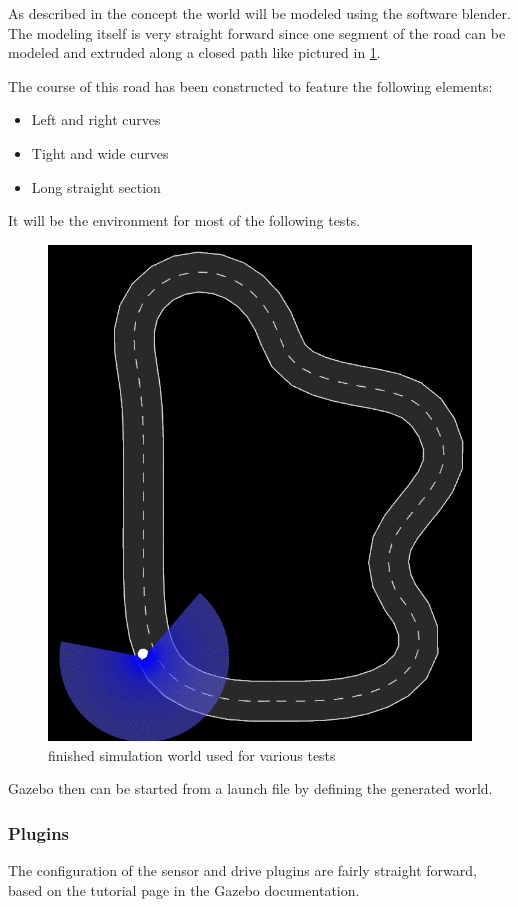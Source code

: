 As described in the concept the world will be modeled using the software blender.\\

The modeling itself is very straight forward since one segment of the road can be modeled and extruded along a closed path like pictured in \ref{simworld}. 

The course of this road has been constructed to feature the following elements:

\begin{itemize}
	\item Left and right curves
	\item Tight and wide curves
	\item Long straight section
\end{itemize}

It will be the environment for most of the following tests.

\begin{figure}
	\centering
	\includegraphics[width=.5\textwidth]{Pictures/test track}
	\caption{finished simulation world used for various tests}
	\label{simworld}
\end{figure}

Gazebo then can be started from a launch file by defining the generated world.\\

\subsubsection{Plugins}
The configuration of the sensor and drive plugins are fairly straight forward, based on the tutorial page in the Gazebo documentation\cite{gazebotutorial}.\\



